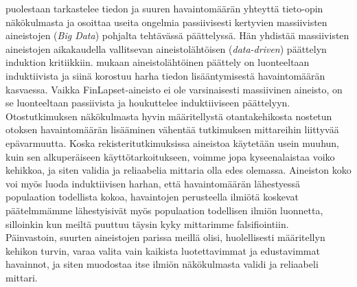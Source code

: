 \documentclass[finnish]{docopts}
\begin{document}
\cite{fricke14} puolestaan tarkastelee tiedon ja suuren havaintomäärän yhteyttä tieto-opin näkökulmasta ja osoittaa useita ongelmia passiivisesti kertyvien massiivisten aineistojen (\textit{Big Data}) pohjalta tehtävässä päättelyssä. Hän yhdistää massiivisten aineistojen aikakaudella vallitsevan aineistolähtöisen (\textit{data-driven}) päättelyn \cite{popper86} induktion kritiikkiin. \cite{fricke14} mukaan aineistolähtöinen päättely on luonteeltaan induktiivista ja siinä korostuu harha tiedon lisääntymisestä havaintomäärän kasvaessa. Vaikka FinLapset-aineisto ei ole varsinaisesti massiivinen aineisto, on se luonteeltaan passiivista ja houkuttelee induktiiviseen päättelyyn.\\

Otostutkimuksen näkökulmasta hyvin määritellystä otantakehikosta nostetun otoksen havaintomäärän lisääminen vähentää tutkimuksen mittareihin liittyvää epävarmuutta. Koska rekisteritutkimuksissa aineistoa käytetään usein muuhun, kuin sen alkuperäiseen käyttötarkoitukseen, voimme jopa kyseenalaistaa voiko kehikkoa, ja siten validia ja reliaabelia mittaria olla edes olemassa. Aineiston koko voi myös luoda induktiivisen harhan, että havaintomäärän lähestyessä populaation todellista kokoa, havaintojen perusteella ilmiötä koskevat päätelmmämme lähestyisivät myös populaation todellisen ilmiön luonnetta, silloinkin kun meiltä puuttuu täysin kyky mittarimme falsifiointiin.\\

Päinvastoin, suurten aineistojen parissa meillä olisi, huolellisesti määritellyn kehikon turvin, varaa valita vain kaikista luotettavimmat ja edustavimmat havainnot, ja siten muodostaa itse ilmiön näkökulmasta validi ja reliaabeli mittari.\\


\nocite{*}
%
%
%




\lastpage

\appendices

\pagestyle{empty}

\end{document}
